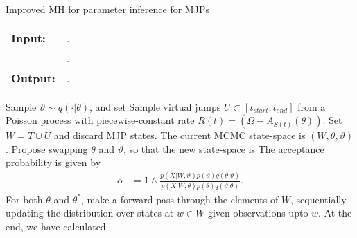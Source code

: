 \begin{algorithm}[H]
   \caption{Improved MH for parameter inference for MJPs }
   \label{alg:MH_improved}
  \begin{tabular}{l l}
   \textbf{Input:  } & \text{The observations $X$,}
                      \text{the previous MJP path $S(t) = (S, T)$ and parameters $\theta$}.\\ 
                     & \text{A  Metropolis-Hasting proposal $q(\cdot | \theta)$}.\\
   \textbf{Output:  }& \text{A new MJP trajectory $S'(t) = (S', T')$, 
                            new MJP parameters $\theta'$}.\\
   \hline
   \end{tabular}
   \begin{algorithmic}[1]
      \State Sample $\vartheta \sim q(\cdot| \theta)$, and 
      set %
    \State Sample virtual jumps $U\subset[t_{start}, t_{end}]$ from a Poisson process with 
    piecewise-constant rate $R(t) = (\Omega - A_{S(t)}(\theta))$. 
    Set $W = T \cup U$ and discard MJP states.
    \State The current MCMC state-space is $(W,\theta,\vartheta)$. Propose swapping
    $\theta$ and $\vartheta$, so that the new state-space is 
     The acceptance probability is given by
        \begin{align*}
        \alpha %
        &=  1 \wedge \frac{p(X| W,\vartheta)p(\vartheta)q(\theta|\vartheta)}
        {p(X| W,\theta)p(\theta) q(\vartheta|\theta)}.
        \end{align*}
    \State For both $\theta$ and $\theta^*$, make a forward pass through the 
    elements of $W$, sequentially updating the distribution over states at 
    $w \in W$ given observations upto $w$. At the end, we have calculated

\end{algorithmic}
\end{algorithm}
